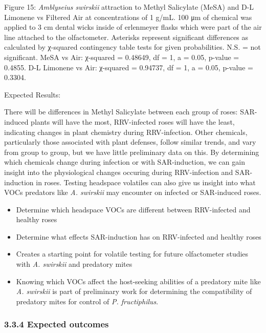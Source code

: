 \documentclass[12pt,final,CPage]{ufthesis}
\begin{document}
{  Figure 15: \emph{Amblyseius swirskii} attraction to Methyl Salicylate (MeSA) and D-L Limonene vs Filtered Air at concentrations of 1 g/mL. 100 μm of chemical was applied to 3 cm dental wicks inside of erlenmeyer flasks which were part of the air line attached to the olfactometer. Asterisks represent significant differences as calculated by χ-squared contingency table tests for given probabilities. N.S. = not significant. MeSA vs Air: χ-squared = 0.48649, df = 1, a = 0.05, p-value = 0.4855. D-L Limonene vs Air: χ-squared = 0.94737, df = 1, a = 0.05, p-value = 0.3304.

  Expected Results:

  There will be differences in Methyl Salicylate between each group of roses: SAR-induced plants will have the most, RRV-infected roses will have the least, indicating changes in plant chemistry during RRV-infection. Other chemicals, particularly those associated with plant defenses, follow similar trends, and vary from group to group, but we have little preliminary data on this. By determining which chemicals change during infection or with SAR-induction, we can gain insight into the physiological changes occuring during RRV-infection and SAR-induction in roses. Testing headspace volatiles can also give us insight into what VOCs predators like \emph{A. swirskii} may encounter on infected or SAR-induced roses.
  \begin{itemize}
  \item
    Determine which headspace VOCs are different between RRV-infected and healthy roses
  \item
    Determine what effects SAR-induction has on RRV-infected and healthy roses
  \item
    Creates a starting point for volatile testing for future olfactometer studies with \emph{A. swirskii} and predatory mites
  \item
    Knowing which VOCs affect the host-seeking abilities of a predatory mite like \emph{A. swirskii} is part of preliminary work for determining the compatibility of predatory mites for control of \emph{P. fructiphilus}.
  \end{itemize}
  \hypertarget{expected-outcomes-1}{%
  \subsubsection{3.3.4 Expected outcomes}\label{expected-outcomes-1}}

}
\end{document}
